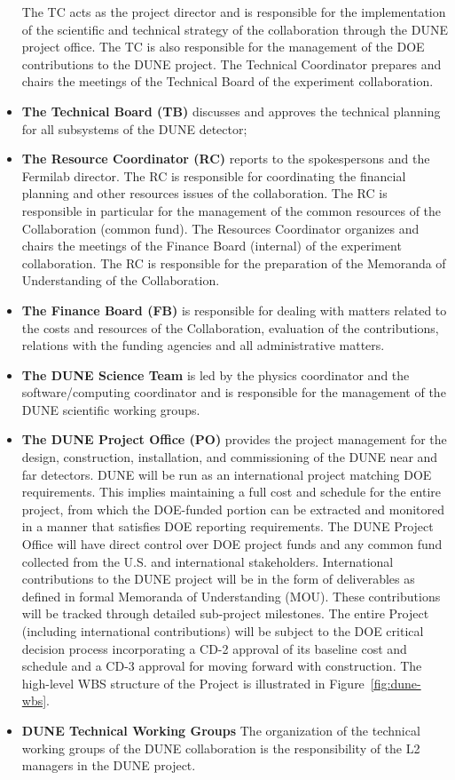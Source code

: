 \begin{itemize}
     The TC acts as the project director 
    and is responsible for the implementation of the scientific and technical strategy of the collaboration through the DUNE project office.
    The TC is also responsible for the management of the DOE contributions to the DUNE project.  
     The Technical Coordinator prepares and chairs the meetings of the Technical Board of the experiment collaboration.
     \item \textbf{The Technical Board (TB)} discusses and approves the technical planning for all subsystems of the DUNE detector;
       \item \textbf{The Resource Coordinator (RC)} reports to the spokespersons and the Fermilab director. The RC
    is responsible for coordinating the financial planning and other
resources issues of the collaboration. The RC is responsible in particular for
the management of the common resources of the Collaboration (common fund).
The Resources Coordinator organizes and chairs the meetings of the Finance Board (internal) of
the experiment collaboration. The RC is responsible for the
preparation of the Memoranda of Understanding of the Collaboration.
    \item \textbf{The Finance Board (FB)} is responsible for dealing with matters related to
the costs and resources of the Collaboration, evaluation of the contributions, relations with the
funding agencies and all administrative matters.  
    \item \textbf{The DUNE Science Team} is led by the physics coordinator and the software/computing coordinator and is responsible for the management of the DUNE scientific working groups.
    \item \textbf{The DUNE Project Office (PO)} provides the project management for the design, construction, installation, and commissioning of the DUNE near and far detectors. DUNE will be run as an international project matching DOE requirements. This implies maintaining a full cost and schedule for the entire project, from which the DOE-funded portion can be extracted and monitored in a manner that satisfies DOE reporting requirements. The DUNE Project Office will have direct control over DOE project funds and any common fund collected from the U.S. and international stakeholders. International contributions to the DUNE project will be in the form of deliverables as defined in formal Memoranda of Understanding (MOU). These contributions will be tracked through detailed sub-project milestones. The entire Project (including international contributions) will be subject to the DOE critical decision process incorporating a CD-2 approval of its baseline cost and schedule and a CD-3 approval for moving forward with construction.  The high-level WBS structure of the Project is illustrated in Figure~\ref{fig:dune-wbs}.
    \item \textbf{DUNE Technical Working Groups} The organization of the technical working groups of the DUNE collaboration is the responsibility of the L2 managers in the DUNE project.
\end{itemize}


